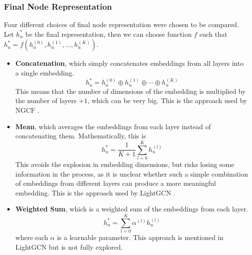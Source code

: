 \documentclass{article}
\begin{document}
\subsubsection{Final Node Representation} \label{final_node_representation}

Four different choices of final node representation were chosen to be compared. Let $h_u^*$ be the final representation, then we can choose function $f$ such that $h_u^*=f(h_u^{(0)},h_u^{(1)},\hdots,h_u^{(K)})$.

\begin{itemize}
    \item \textbf{Concatenation}, which simply concatenates embeddings from all layers into a single embedding.
    $$h_u^*=h_u^{(0)} \oplus h_u^{(1)} \oplus \cdots \oplus h_u^{(K)}$$
    This means that the number of dimensions of the embedding is multiplied by the number of layers $+1$, which can be very big. This is the approach used by NGCF \cite{ngcf}.
    \item \textbf{Mean}, which averages the embeddings from each layer instead of concatenating them. Mathematically, this is
    $$h_u^*=\frac{1}{K+1}\sum_{l=0}^Kh_u^{(l)}$$
    This avoids the explosion in embedding dimensions, but risks losing some information in the process, as it is unclear whether such a simple combination of embeddings from different layers can produce a more meaningful embedding. This is the approach used by LightGCN \cite{lightgcn}.
    \item \textbf{Weighted Sum}, which is a weighted sum of the embeddings from each layer.
    $$h_u^*=\sum_{l=0}^K\alpha^{(l)}h_u^{(l)}$$
    where each $\alpha$ is a learnable parameter. This approach is mentioned in LightGCN \cite{lightgcn} but is not fully explored.
    

\end{itemize}
\end{document}

